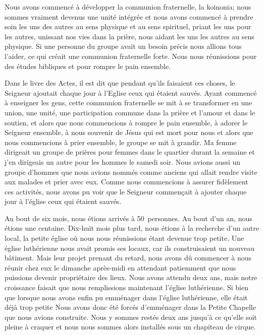Nous avons commencé à développer la communion fraternelle, la \og koinonia\fg{}; nous sommes vraiment devenus une
\og unité intégrée\fg{} et nous avons commencé à prendre soin les uns des autres au sens physique et au sens spirituel,
priant les uns pour les autres, unissant nos vies dans la prière, nous aidant les uns les autres au sens physique. Si une
personne du groupe avait un besoin précis nous allions tous l’aider, ce qui créait une communion fraternelle forte.
Nous nous réunissions pour des études bibliques et pour rompre le pain ensemble.

Dans le livre des Actes, il est dit que pendant qu'ils faisaient ces choses, le Seigneur ajoutait chaque jour à l’Eglise
ceux qui étaient sauvés. Ayant commencé à enseigner les gens, cette communion fraternelle se mit à se transformer
en une union, une unité, une participation commune dans la prière et l’amour et dans le soutien, et alors que nous
commencions à rompre le pain ensemble, à adorer le Seigneur ensemble, à nous souvenir de Jésus qui est mort pour
nous et alors que nous commencions à prier ensemble, le groupe se mit à grandir. Ma femme dirigeait un groupe de
prières pour femmes dans le quartier durant la semaine et j’en dirigeais un autre pour les hommes le samedi soir.
Nous avions aussi un groupe d’hommes que nous avions nommés comme anciens qui allait rendre visite aux malades
et prier avec eux. Comme nous commencions à assurer fidèlement ces activités, nous avons pu voir que le Seigneur
commençait à ajouter chaque jour à l’église ceux qui étaient sauvés.

Au bout de six mois, nous étions arrivés à 50~personnes. Au bout d’un an, nous étions une centaine. Dix-huit mois
plus tard, nous étions à la recherche d’un autre local, la petite église où nous nous réunissions étant devenue trop
petite. Une église luthérienne nous avait promis ses locaux, car ils construisaient un nouveau bâtiment. Mais leur
projet prenant du retard, nous avons dû commencer à nous réunir chez eux le dimanche après-midi en attendant
patiemment que nous puissions devenir propriétaire des lieux. Nous avons attendu deux ans, mais notre croissance
faisait que nous remplissions maintenant l'église luthérienne. Si bien que lorsque nous avons enfin pu emménager
dans l'église luthérienne, elle était déjà trop petite Nous avons donc été forcés d'emménager dans la \og Petite Chapelle\fg{}
que nous avions construite. Nous y sommes restés deux ans jusqu’à ce qu'elle soit pleine à craquer et nous nous
sommes alors installés sous un chapiteau de cirque.

